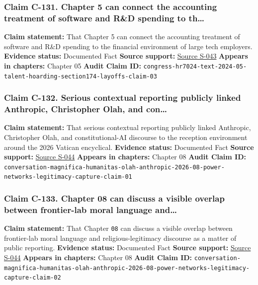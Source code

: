 \documentclass[
  american,
  11pt,
  letterpaper,
]{article}
\begin{document}
\subsubsection{Claim C-131. Chapter 5 can connect the accounting
treatment of software and R\&D spending to
th\ldots{}}\label{claim-c-131-chapter-5-can-connect-the-accounting-treatment-of-software-and-r-d-spending-to-th}

\textbf{Claim statement:} That Chapter 5 can connect the accounting
treatment of software and R\&D spending to the financial environment of
large tech employers. \textbf{Evidence status:} Documented Fact
\textbf{Source support:}
\hyperref[source-s-043-h-r-7024-text-deduction-for-domestic-research-and-experimental-expenditures]{Source
S-043} \textbf{Appears in chapters:} Chapter 05 \textbf{Audit Claim ID:}
\texttt{congress-hr7024-text-2024-05-talent-hoarding-section174-layoffs-claim-03}

\subsubsection{Claim C-132. Serious contextual reporting publicly linked
Anthropic, Christopher Olah, and
con\ldots{}}\label{claim-c-132-serious-contextual-reporting-publicly-linked-anthropic-christopher-olah-and-con}

\textbf{Claim statement:} That serious contextual reporting publicly
linked Anthropic, Christopher Olah, and constitutional-AI discourse to
the reception environment around the 2026 Vatican encyclical.
\textbf{Evidence status:} Documented Fact \textbf{Source support:}
\hyperref[source-s-044-magnifica-humanitas-el-papel-de-christopher-olah-y-anthropic-en-la-enc-clica-sobre-la-ia-del-papa-le-n-xiv]{Source
S-044} \textbf{Appears in chapters:} Chapter 08 \textbf{Audit Claim ID:}
\texttt{conversation-magnifica-humanitas-olah-anthropic-2026-08-power-networks-legitimacy-capture-claim-01}

\subsubsection{Claim C-133. Chapter 08 can discuss a visible overlap
between frontier-lab moral language
and\ldots{}}\label{claim-c-133-chapter-08-can-discuss-a-visible-overlap-between-frontier-lab-moral-language-and}

\textbf{Claim statement:} That Chapter \texttt{08} can discuss a visible
overlap between frontier-lab moral language and religious-legitimacy
discourse as a matter of public reporting. \textbf{Evidence status:}
Documented Fact \textbf{Source support:}
\hyperref[source-s-044-magnifica-humanitas-el-papel-de-christopher-olah-y-anthropic-en-la-enc-clica-sobre-la-ia-del-papa-le-n-xiv]{Source
S-044} \textbf{Appears in chapters:} Chapter 08 \textbf{Audit Claim ID:}
\texttt{conversation-magnifica-humanitas-olah-anthropic-2026-08-power-networks-legitimacy-capture-claim-02}
\end{document}
